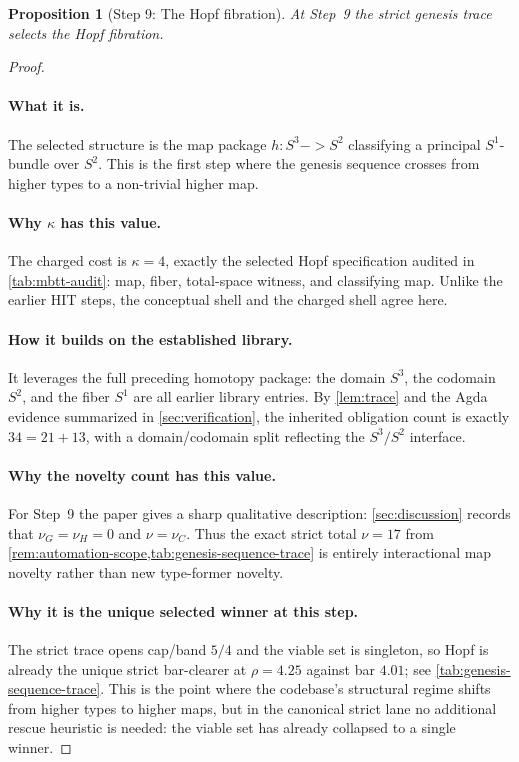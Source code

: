 \documentclass[11pt,a4paper]{article}
\def\to{->}%
\theoremstyle{plain}
\newtheorem{proposition}[theorem]{Proposition}
\theoremstyle{definition}
\theoremstyle{remark}
\begin{document}
\begin{proposition}[Step 9: The Hopf fibration]
\label{prop:genesis-step9}
At Step~9 the strict genesis trace selects the Hopf fibration.
\end{proposition}

\begin{proof}
\paragraph{What it is.}
The selected structure is the map package
$h:S^3\to S^2$ classifying a principal $S^1$-bundle over $S^2$.
This is the first step where the genesis sequence crosses from higher types to a
non-trivial higher map.

\paragraph{Why $\kappa$ has this value.}
The charged cost is $\kappa=4$, exactly the selected Hopf specification audited
in \cref{tab:mbtt-audit}: map, fiber, total-space witness, and classifying map.
Unlike the earlier HIT steps, the conceptual shell and the charged shell agree
here.

\paragraph{How it builds on the established library.}
It leverages the full preceding homotopy package:
the domain $S^3$, the codomain $S^2$, and the fiber $S^1$ are all earlier
library entries.
By \cref{lem:trace} and the Agda evidence summarized in
\cref{sec:verification}, the inherited obligation count is exactly
$34=21+13$, with a domain/codomain split reflecting the $S^3/S^2$ interface.

\paragraph{Why the novelty count has this value.}
For Step~9 the paper gives a sharp qualitative description:
\cref{sec:discussion} records that $\nu_G=\nu_H=0$ and $\nu=\nu_C$.
Thus the exact strict total $\nu=17$ from
\cref{rem:automation-scope,tab:genesis-sequence-trace} is entirely interactional
map novelty rather than new type-former novelty.

\paragraph{Why it is the unique selected winner at this step.}
The strict trace opens cap/band $5/4$ and the viable set is singleton, so Hopf
is already the unique strict bar-clearer at $\rho=4.25$ against bar $4.01$; see
\cref{tab:genesis-sequence-trace}.
This is the point where the codebase's structural regime shifts from higher
types to higher maps, but in the canonical strict lane no additional rescue
heuristic is needed: the viable set has already collapsed to a single winner.
\end{proof}
\end{document}
